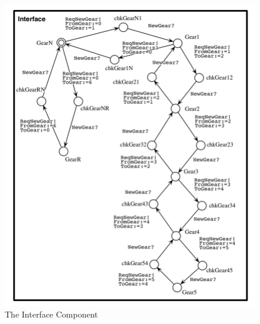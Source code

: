 \begin{figure}[H]       
\centering            
\includegraphics[scale=0.5]{Figures/gbi}
\caption{The Interface Component}
\label{fig:gbi}         
\end{figure}  

